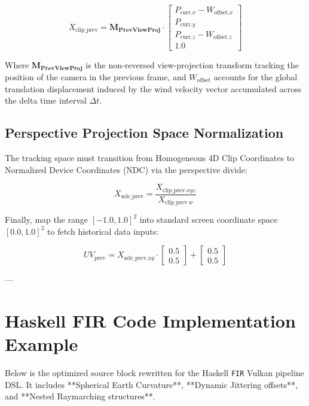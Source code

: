 \documentclass[11pt,a4paper]{article}
\begin{document}
\begin{equation}
    X_{\text{clip\_prev}} = \mathbf{M_{\text{PrevViewProj}}} \cdot \begin{bmatrix} P_{\text{curr}.x} - W_{\text{offset}.x} \\ P_{\text{curr}.y} \\ P_{\text{curr}.z} - W_{\text{offset}.z} \\ 1.0 \end{bmatrix}
\end{equation}

Where $\mathbf{M_{\text{PrevViewProj}}}$ is the non-reversed view-projection transform tracking the position of the camera in the previous frame, and $W_{\text{offset}}$ accounts for the global translation displacement induced by the wind velocity vector accumulated across the delta time interval $\Delta t$.

\subsection{Perspective Projection Space Normalization}
The tracking space must transition from Homogeneous 4D Clip Coordinates to Normalized Device Coordinates (NDC) via the perspective divide:

\begin{equation}
    X_{\text{ndc\_prev}} = \frac{X_{\text{clip\_prev}.xyz}}{X_{\text{clip\_prev}.w}}
\end{equation}

Finally, map the range $[-1.0, 1.0]^2$ into standard screen coordinate space $[0.0, 1.0]^2$ to fetch historical data inputs:

\begin{equation}
    UV_{\text{prev}} = X_{\text{ndc\_prev}.xy} \cdot \begin{bmatrix} 0.5 \\ 0.5 \end{bmatrix} + \begin{bmatrix} 0.5 \\ 0.5 \end{bmatrix}
\end{equation}

---

\section{Haskell FIR Code Implementation Example}
Below is the optimized source block rewritten for the Haskell \texttt{FIR} Vulkan pipeline DSL. It includes **Spherical Earth Curvature**, **Dynamic Jittering offsets**, and **Nested Raymarching structures**.
\end{document}
